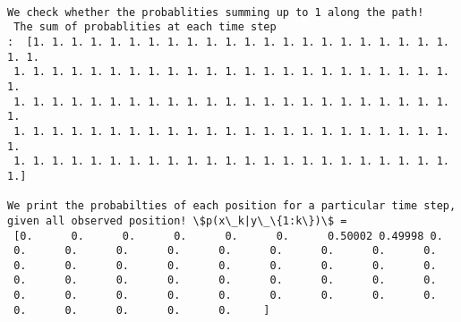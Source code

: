 \documentclass[11pt]{article}
\begin{document}
    \begin{Verbatim}[commandchars=\\\{\}]

We check whether the probablities summing up to 1 along the path! 
 The sum of probablities at each time step 
:  [1. 1. 1. 1. 1. 1. 1. 1. 1. 1. 1. 1. 1. 1. 1. 1. 1. 1. 1. 1. 1. 1. 1. 1.
 1. 1. 1. 1. 1. 1. 1. 1. 1. 1. 1. 1. 1. 1. 1. 1. 1. 1. 1. 1. 1. 1. 1. 1.
 1. 1. 1. 1. 1. 1. 1. 1. 1. 1. 1. 1. 1. 1. 1. 1. 1. 1. 1. 1. 1. 1. 1. 1.
 1. 1. 1. 1. 1. 1. 1. 1. 1. 1. 1. 1. 1. 1. 1. 1. 1. 1. 1. 1. 1. 1. 1. 1.
 1. 1. 1. 1. 1. 1. 1. 1. 1. 1. 1. 1. 1. 1. 1. 1. 1. 1. 1. 1. 1. 1. 1. 1.]

We print the probabilties of each position for a particular time step, given all observed position! \$p(x\_k|y\_\{1:k\})\$ =  
 [0.      0.      0.      0.      0.      0.      0.50002 0.49998 0.
 0.      0.      0.      0.      0.      0.      0.      0.      0.
 0.      0.      0.      0.      0.      0.      0.      0.      0.
 0.      0.      0.      0.      0.      0.      0.      0.      0.
 0.      0.      0.      0.      0.      0.      0.      0.      0.
 0.      0.      0.      0.      0.     ]

    \end{Verbatim}
\end{document}
